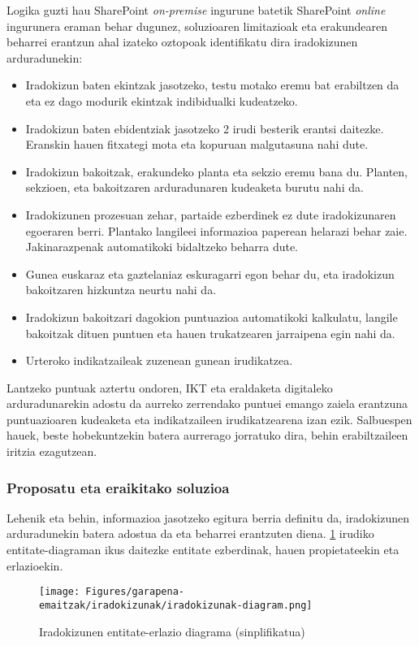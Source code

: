 Logika guzti hau SharePoint \textit{on-premise} ingurune batetik SharePoint \textit{online} ingurunera eraman behar dugunez, soluzioaren limitazioak eta 
erakundearen beharrei erantzun ahal izateko oztopoak identifikatu dira iradokizunen arduradunekin:
\begin{itemize}
  \item Iradokizun baten ekintzak jasotzeko, testu motako eremu bat erabiltzen da eta ez dago modurik ekintzak indibidualki kudeatzeko.
  \item Iradokizun baten ebidentziak jasotzeko 2 irudi besterik erantsi daitezke. Eranskin hauen fitxategi mota eta kopuruan malgutasuna nahi dute.
  \item Iradokizun bakoitzak, erakundeko planta eta sekzio eremu bana du. Planten, sekzioen, eta bakoitzaren arduradunaren kudeaketa burutu nahi da. 
  \item Iradokizunen prozesuan zehar, partaide ezberdinek ez dute iradokizunaren egoeraren berri. Plantako langileei informazioa paperean
  helarazi behar zaie. Jakinarazpenak automatikoki bidaltzeko beharra dute.
  \item Gunea euskaraz eta gaztelaniaz eskuragarri egon behar du, eta iradokizun bakoitzaren hizkuntza neurtu nahi da.
  \item Iradokizun bakoitzari dagokion puntuazioa automatikoki kalkulatu, langile bakoitzak dituen puntuen eta hauen trukatzearen jarraipena egin nahi da.
  \item Urteroko indikatzaileak zuzenean gunean irudikatzea.
\end{itemize}

Lantzeko puntuak aztertu ondoren, IKT eta eraldaketa digitaleko arduradunarekin adostu da aurreko zerrendako puntuei emango zaiela erantzuna puntuazioaren kudeaketa eta indikatzaileen irudikatzearena izan ezik.
Salbuespen hauek, beste hobekuntzekin batera aurrerago jorratuko dira, behin erabiltzaileen iritzia ezagutzean.

\subsubsection{Proposatu eta eraikitako soluzioa}

Lehenik eta behin, informazioa jasotzeko egitura berria definitu da, iradokizunen arduradunekin batera adostua da eta beharrei erantzuten diena. \ref{img:erlazio-diagrama} irudiko entitate-diagraman ikus daitezke entitate ezberdinak, hauen propietateekin eta erlazioekin.

\begin{figure}[H]
\centering
\texttt{[image: Figures/garapena-emaitzak/iradokizunak/iradokizunak-diagram.png]}
\caption{Iradokizunen entitate-erlazio diagrama (sinplifikatua)}
\label{img:erlazio-diagrama}
\end{figure}

